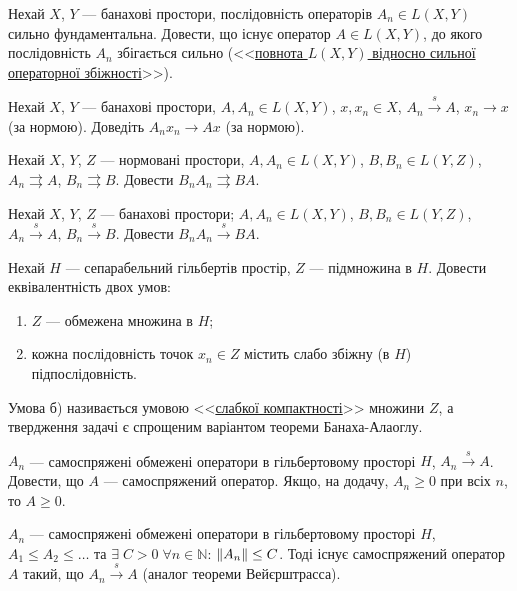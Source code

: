 \begin{exercise}
    Нехай $X$, $Y$ --- банахові простори, послідовність операторів $A_n \in L(X,Y)$ сильно
    фундаментальна. Довести, що існує оператор $A \in L(X,Y)$, до якого послідовність $A_n$
    збігається сильно (<<\ul{повнота $L(X,Y)$ відносно сильної операторної збіжності}>>).
\end{exercise}

\begin{exercise}
    Нехай $X$, $Y$ --- банахові простори, $A, A_n \in L(X,Y)$, $x, x_n \in X$,
    $A_n \overset{s}{\to} A$, $x_n \to x$ (за нормою). Доведіть $A_n x_n \to Ax$ (за нормою).
\end{exercise}

\begin{exercise}
    Нехай $X$, $Y$, $Z$ --- нормовані простори, $A, A_n \in L(X,Y)$, $B, B_n \in L(Y,Z)$,
    $A_n \rightrightarrows A$, $B_n \rightrightarrows B$.
    Довести $B_n A_n \rightrightarrows BA$.
\end{exercise}

\begin{exercise}
    Нехай $X$, $Y$, $Z$ --- банахові простори; $A, A_n \in L(X,Y)$, $B, B_n \in L(Y,Z)$,
    $A_n \overset{s}{\to} A$, $B_n \overset{s}{\to} B$.
    Довести $B_n A_n \overset{s}{\to} BA$.
\end{exercise}

\begin{exercise}\label{N:1_4_26}
    Нехай $H$ --- сепарабельний гільбертів простір, $Z$ --- підмножина в $H$.
    Довести еквівалентність двох умов:
    \begin{enumerate}
        \item $Z$ --- обмежена множина в $H$;
        \item кожна послідовність точок $x_n \in Z$ містить слабо збіжну (в $H$) 
        підпослідовність.
    \end{enumerate}
    Умова б) називається умовою <<\uline{слабкої компактності}>> множини $Z$,
    а твердження задачі є спрощеним варіантом теореми Банаха-Алаоглу.
\end{exercise}

\begin{exercise}
    $A_n$ --- самоспряжені обмежені оператори в гільбертовому просторі $H$,
    $A_n \overset{s}{\to} A$. Довести, що $A$ --- самоспряжений оператор.
    Якщо, на додачу, $A_n \geq 0$ при всіх $n$, то $A \geq 0$.
\end{exercise}

\begin{exercise}
    $A_n$ --- самоспряжені обмежені оператори в гільбертовому просторі $H$,
    $A_1 \leq A_2 \leq \dots$ та $\exists \; C > 0 \; \forall n \in \mathbb{N}$: $\left\lVert A_n\right\rVert\leq C$.
    Тоді існує самоспряжений оператор $A$ такий, що $A_n \overset{s}{\to} A$
    (аналог теореми Вейєрштрасса).
\end{exercise}

